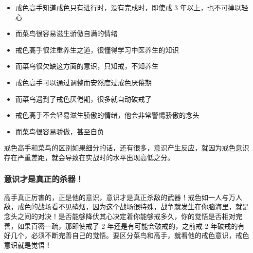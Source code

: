\documentclass{ctexart}
\begin{document}
\begin{paracol}{2}
    \begin{itemize}
        \item 戒色高手知道戒色只有进行时，没有完成时，即使戒 3 年以上，也不可掉以轻心
    \end{itemize}
    \switchcolumn
    \begin{itemize}
        \item 而菜鸟很容易滋生骄傲自满的情绪
    \end{itemize}
    \switchcolumn*

    \begin{itemize}
        \item 戒色高手很注重养生之道，很懂得学习中医养生的知识
    \end{itemize}
    \switchcolumn
    \begin{itemize}
        \item 而菜鸟很欠缺这方面的意识，只知戒，不知养生
    \end{itemize}
    \switchcolumn*

    \begin{itemize}
        \item 戒色高手可以通过调整而安然度过戒色厌倦期
    \end{itemize}
    \switchcolumn
    \begin{itemize}
        \item 而菜鸟遇到了戒色厌倦期，很多就自动破戒了
    \end{itemize}
    \switchcolumn*

    \begin{itemize}
        \item 戒色高手不会轻易滋生骄傲的情绪，他会非常警惕骄傲的念头
    \end{itemize}
    \switchcolumn
    \begin{itemize}
        \item 而菜鸟很容易骄傲，甚至自负
    \end{itemize}
    \switchcolumn*
\end{paracol}

戒色高手和菜鸟的区别如果细分的话，还有很多，意识产生反应，就因为戒色意识存在严重差距，就会导致在实战时的水平出现高低之分。

\subsubsection{意识才是真正的杀器！}

高手真正厉害的，正是他的意识，意识才是真正杀敌的武器！戒色如一人与万人敌，戒色的战场看不见硝烟，因为这个战场很特殊，战争就发生在你脑海里，就是念头之间的对决！是否能够降伏其心决定着你能够戒多久，你的觉悟是否相对完善，如果百密一疏，那即使戒了 2 年还是有可能会破戒的，之前戒 2 年破戒的有好几个，必须不断完善自己的觉悟。要区分菜鸟和高手，就看他的戒色意识，戒色意识就是觉悟！
\end{document}
